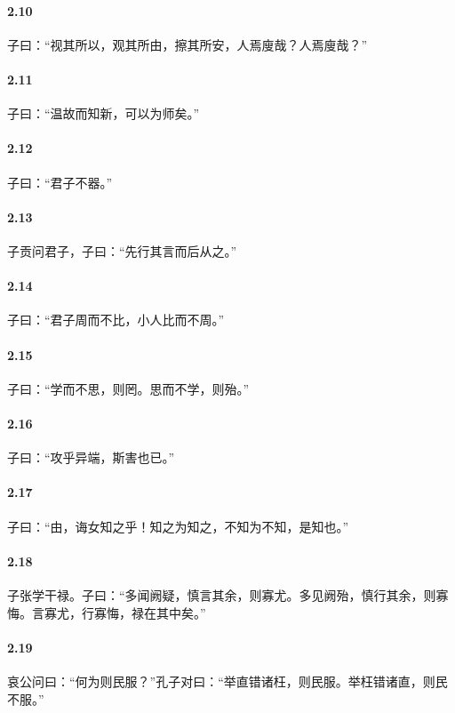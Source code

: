 \documentclass[main.tex]{subfiles}
\begin{document}
\paragraph{2.10}
子曰：“视其所以，观其所由，擦其所安，人焉廋哉？人焉廋哉？”

\paragraph{2.11}
子曰：“温故而知新，可以为师矣。”

\paragraph{2.12}
子曰：“君子不器。”

\paragraph{2.13}
子贡问君子，子曰：“先行其言而后从之。”

\paragraph{2.14}
子曰：“君子周而不比，小人比而不周。”

\paragraph{2.15}
子曰：“学而不思，则罔。思而不学，则殆。”

\paragraph{2.16}
子曰：“攻乎异端，斯害也已。”

\paragraph{2.17}
子曰：“由，诲女知之乎！知之为知之，不知为不知，是知也。”

\paragraph{2.18}
子张学干禄。子曰：“多闻阙疑，慎言其余，则寡尤。多见阙殆，慎行其余，则寡悔。言寡尤，行寡悔，禄在其中矣。”

\paragraph{2.19}
哀公问曰：“何为则民服？”孔子对曰：“举直错诸枉，则民服。举枉错诸直，则民不服。”
\end{document}
